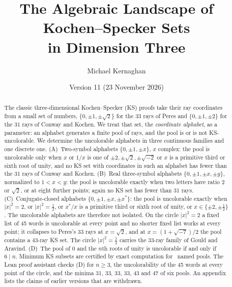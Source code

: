 \documentclass[11pt,a4paper]{article}
\title{The Algebraic Landscape of Kochen--Specker Sets\\in Dimension Three}
\author{Michael Kernaghan}
\date{Version 11 (23 November 2026)}
\theoremstyle{definition}
\theoremstyle{remark}
\begin{document}
\maketitle

\begin{abstract}
The classic three-dimensional Kochen--Specker (KS) proofs take their ray coordinates from a small
set of numbers, $\{0,\pm1,\pm\sqrt2\}$ for the 33 rays of Peres and $\{0,\pm1,\pm2\}$ for the 31
rays of Conway and Kochen.  We treat that set, the \emph{coordinate alphabet}, as a parameter:
an alphabet generates a finite pool of rays, and the pool is or is not KS-uncolorable.  We
determine the uncolorable alphabets in three continuous families and one discrete one.
(A)~Two-symbol alphabets $\{0,\pm1,\pm x\}$, $x$ complex: the pool is uncolorable only when $x$
or $1/x$ is one of $\pm2,\pm\sqrt2,\pm\sqrt{-2}$ or $x$ is a primitive third or sixth root of
unity, and no KS set with coordinates in such an alphabet has fewer than the 31 rays of Conway
and Kochen.  (B)~Real three-symbol alphabets $\{0,\pm1,\pm x,\pm y\}$, normalized to $1<x<y$:
the pool is uncolorable exactly when two letters have ratio $2$ or $\sqrt2$, or at eight
further points; again no KS set has fewer than 31 rays.  (C)~Conjugate-closed alphabets $\{0,\pm1,\pm x,\pm x^{*}\}$: the
pool is uncolorable exactly when $|x|^2=2$, or $|x|^2=\tfrac12$, or $x^{*}/x$ is a primitive
third or sixth root of unity, or $x\in\{\pm2,\pm\tfrac12\}$.  The uncolorable alphabets are
therefore not isolated.  On the circle $|x|^2=2$ a fixed list of 45 words is uncolorable at
every point and no shorter fixed list works at every point; it collapses to Peres's 33 rays at $x=\sqrt2$, and
at $x=(1+\sqrt{-7})/2$ the pool contains a 43-ray KS set.  The circle $|x|^2=\tfrac12$ carries
the 33-ray family of Gould and Aravind.  (D)~The pool of $0$ and the $n$th roots of unity is
uncolorable if and only if $6\mid n$.  Minimum KS subsets are certified by exact computation
for \ncertified\ named pools.  The Lean proof assistant checks (D) for $n\ge3$, the
uncolorability of the 45 words at every point of the circle, and the minima 31, 33, 33, 33, 43
and 47 of six pools.  An appendix lists the claims of earlier versions that are withdrawn.
\end{abstract}








\end{document}

